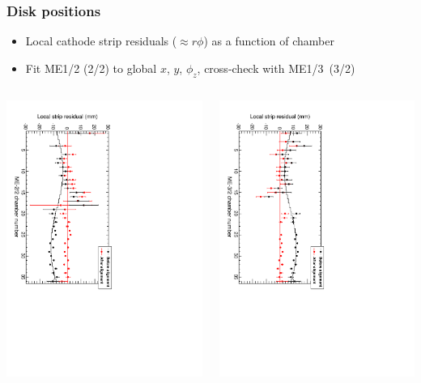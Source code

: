 \documentclass[compress]{beamer}
\begin{document}
\begin{frame}
\frametitle{Disk positions}
\begin{itemize}
\item Local cathode strip residuals ($\approx r\phi$) as a function of chamber
\item Fit ME1/2 (2/2) to global $x$, $y$, $\phi_z$, cross-check with \mbox{ME1/3 (3/2)\hspace{-1 cm}}
\end{itemize}

\begin{columns}
\includegraphics[height=\linewidth, angle=90]{endcap_mem22.pdf}

\includegraphics[height=\linewidth, angle=90]{endcap_mem32.pdf}


\end{columns}
\end{frame}
\end{document}
